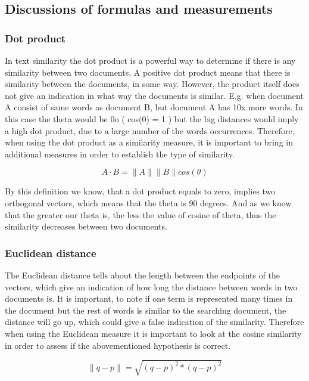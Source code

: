 \documentclass[11pt]{article}
\begin{document}
    \subsection{Discussions of formulas and
measurements}\label{discussions-of-formulas-and-measurements}

\subsubsection{Dot product}\label{dot-product}

In text similarity the dot product is a powerful way to determine if
there is any similarity between two documents. A positive dot product
means that there is similarity between the documents, in some way.
However, the product itself does not give an indication in what way the
documents is similar. E.g. when document A consist of same words as
document B, but document A has 10x more words. In this case the theta
would be 0o ( cos(0) = 1 ) but the big distances would imply a high dot
product, due to a large number of the words occurrences. Therefore, when
using the dot product as a similarity measure, it is important to bring
in additional measures in order to establish the type of similarity.

\[ A \cdot B =\| A \| \| B \| cos(\theta) \]

By this definition we know, that a dot product equals to zero, implies
two orthogonal vectors, which means that the theta is 90 degrees. And as
we know that the greater our theta is, the less the value of cosine of
theta, thus the similarity decreases between two documents.

\subsubsection{Euclidean distance}\label{euclidean-distance}

The Euclidean distance tells about the length between the endpoints of
the vectors, which give an indication of how long the distance between
words in two documents is. It is important, to note if one term is
represented many times in the document but the rest of words is similar
to the searching document, the distance will go up, which could give a
false indication of the similarity. Therefore when using the Euclidean
measure it is important to look at the cosine similarity in order to
assess if the abovementioned hypothesis is correct.

\[ \| q - p \| = \sqrt{(q - p)^2 * (q - p)^2}\]
\end{document}
